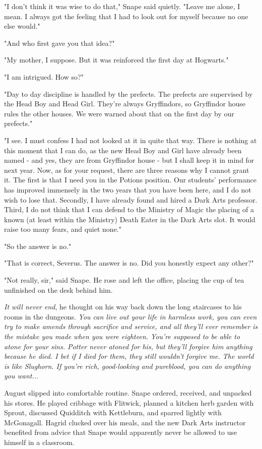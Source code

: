 \documentclass[a4paper,11pt]{article}
\begin{document}
"I don't think it was wise to do that," Snape said quietly. "Leave me alone, I mean. I always got the feeling that I had to look out for myself because no one else would."

"And who first gave you that idea?"

"My mother, I suppose. But it was reinforced the first day at Hogwarts."

"I am intrigued. How so?"

"Day to day discipline is handled by the prefects. The prefects are supervised by the Head Boy and Head Girl. They're always Gryffindors, so Gryffindor house rules the other houses. We were warned about that on the first day by our prefects."

"I see. I must confess I had not looked at it in quite that way. There is nothing at this moment that I can do, as the new Head Boy and Girl have already been named - and yes, they are from Gryffindor house - but I shall keep it in mind for next year. Now, as for your request, there are three reasons why I cannot grant it. The first is that I need you in the Potions position. Our students' performance has improved immensely in the two years that you have been here, and I do not wish to lose that. Secondly, I have already found and hired a Dark Arts professor. Third, I do not think that I can defend to the Ministry of Magic the placing of a known (at least within the Ministry) Death Eater in the Dark Arts slot. It would raise too many fears, and quiet none."

"So the answer is no."

"That is correct, Severus. The answer is no. Did you honestly expect any other?"

"Not really, sir," said Snape. He rose and left the office, placing the cup of tea unfinished on the desk behind him.

\emph{It will never end}, he thought on his way back down the long staircases to his rooms in the dungeons. \emph{You can live out your life in harmless work, you can even try to make amends through sacrifice and service, and all they'll ever remember is the mistake you made when you were eighteen. You're supposed to be able to atone for your sins. Potter never atoned for his, but they'll forgive him anything because he died. I bet if I died for them, they still wouldn't forgive me. The world is like Slughorn. If you're rich, good-looking and pureblood, you can do anything you want...}

August slipped into comfortable routine. Snape ordered, received, and unpacked his stores. He played cribbage with Flitwick, planned a kitchen herb garden with Sprout, discussed Quidditch with Kettleburn, and sparred lightly with McGonagall. Hagrid clucked over his meals, and the new Dark Arts instructor benefited from advice that Snape would apparently never be allowed to use himself in a classroom.
\end{document}
